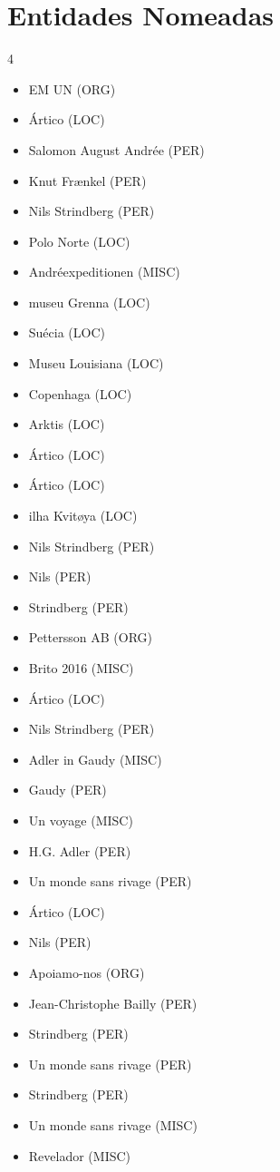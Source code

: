 \documentclass{article}
\begin{document}
\section*{Entidades Nomeadas}
\begin{multicols}{4}
\begin{itemize}
\item EM UN (ORG)
\item Ártico (LOC)
\item Salomon August Andrée (PER)
\item Knut Frænkel (PER)
\item Nils Strindberg (PER)
\item Polo Norte (LOC)
\item Andréexpeditionen (MISC)
\item museu Grenna (LOC)
\item Suécia (LOC)
\item Museu Louisiana (LOC)
\item Copenhaga (LOC)
\item Arktis (LOC)
\item Ártico (LOC)
\item Ártico (LOC)
\item ilha Kvitøya (LOC)
\item Nils Strindberg (PER)
\item Nils (PER)
\item Strindberg (PER)
\item Pettersson AB (ORG)
\item Brito 2016 (MISC)
\item Ártico (LOC)
\item Nils Strindberg (PER)
\item Adler in Gaudy (MISC)
\item Gaudy (PER)
\item Un voyage (MISC)
\item H.G. Adler (PER)
\item Un monde sans rivage (PER)
\item Ártico (LOC)
\item Nils (PER)
\item Apoiamo-nos (ORG)
\item Jean-Christophe Bailly (PER)
\item Strindberg (PER)
\item Un monde sans rivage (PER)
\item Strindberg (PER)
\item Un monde sans rivage (MISC)
\item Revelador (MISC)

\end{itemize}
\end{multicols}
\end{document}
